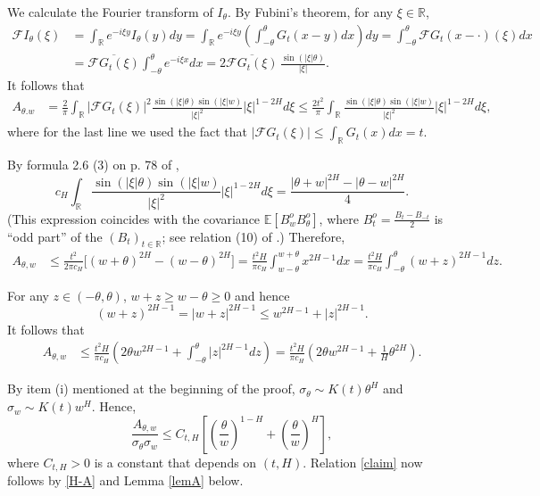 \documentclass[12pt]{article}
\def\cF{\mathcal{F}}
\def\bE{\mathbb{E}}
\def\bR{\mathbb{R}}
\begin{document}
We calculate the Fourier transform of $I_{\theta}$. By Fubini's theorem, for any $\xi \in \bR$,
\begin{align*}
\cF I_{\theta}(\xi)&=\int_{\bR}e^{-i\xi y}I_{\theta}(y)dy=\int_{\bR}e^{-i\xi y}\left(\int_{-\theta}^{\theta}G_t(x-y)dx\right)dy=\int_{-\theta}^{\theta} \cF G_t(x-\cdot)(\xi)dx\\
&=\overline{\cF G_t(\xi)} \int_{-\theta}^{\theta} e^{-i\xi x} dx=2\overline{\cF G_t(\xi)} \, \frac{\sin(|\xi|\theta)}{|\xi|}.
\end{align*}
It follows that
\begin{align*}
A_{\theta.w}&=\frac{2}{\pi}\int_{\bR}|\cF G_t(\xi)|^2 \frac{\sin(|\xi|\theta) \sin(|\xi|w)}{|\xi|^2}|\xi|^{1-2H}d\xi \leq \frac{2t^2}{\pi} \int_{\bR}\frac{\sin(|\xi|\theta) \sin(|\xi|w)}{|\xi|^2}|\xi|^{1-2H}d\xi,
\end{align*}
where for the last line we used the fact that $|\cF G_t(\xi)|\leq \int_{\bR}G_t(x)dx=t$.

By formula 2.6 (3) on p. 78 of \cite{erdelyi54},
\[
c_H \int_{\bR}\frac{\sin(|\xi|\theta) \sin(|\xi|w)}{|\xi|^2}|\xi|^{1-2H}d\xi=\frac{|\theta+w|^{2H}-|\theta-w|^{2H}}{4}.
\]
(This expression coincides with the covariance $\bE[B_w^o B_{\theta}^o]$, where $B_t^{o}=\frac{B_t-B_{-t}}{2}$ is ``odd part'' of the $(B_t)_{t\in \bR}$; see relation (10) of \cite{DZ04}.) Therefore,
\begin{align*}
A_{\theta,w} &\leq \frac{t^2}{2\pi c_H}  \big[ (w+\theta)^{2H}-(w-\theta)^{2H}\big]=\frac{t^2 H}{\pi c_H}  \int_{w-\theta}^{w+\theta}x^{2H-1}dx = \frac{t^2 H}{\pi c_H}   \int_{-\theta}^{\theta}(w+z)^{2H-1}dz.
\end{align*}

For any $z \in (-\theta,\theta)$, $w+z\geq w-\theta\geq 0$ and hence 
\[
(w+z)^{2H-1}=|w+z|^{2H-1}\leq w^{2H-1}+|z|^{2H-1}.
\]
It follows that
\begin{align*}
A_{\theta,w} & \leq  \frac{t^2 H}{\pi c_H}    \left( 2\theta w^{2H-1}+\int_{-\theta}^{\theta}|z|^{2H-1}dz\right)= \frac{t^2 H}{\pi c_H}   \left( 2\theta w^{2H-1}+\frac{1}{H}\theta^{2H}\right).
\end{align*}

By item (i) mentioned at the beginning of the proof,
$\sigma_{\theta} \sim K(t) \theta^{H}$ and $\sigma_{w} \sim K(t) w^{H}$. Hence,
\[
\frac{A_{\theta,w}}{\sigma_{\theta}\sigma_w} \leq C_{t,H} \left[ \left( \frac{\theta}{w}\right)^{1-H}+\left(\frac{\theta}{w}\right)^H\right],
\]
where $C_{t,H}>0$ is a constant that depends on $(t,H)$. Relation \eqref{claim} now follows by \eqref{H-A} and Lemma \ref{lemA} below.
\end{document}
